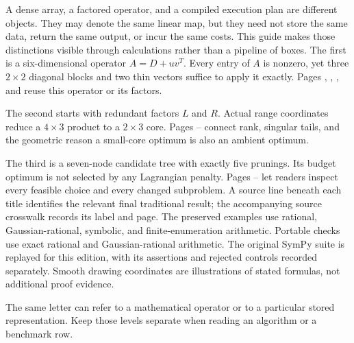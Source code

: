 A dense array, a factored operator, and a compiled execution plan are different objects. They may denote the same linear map, but they need not store the same data, return the same output, or incur the same costs. This guide makes those distinctions visible through calculations rather than a pipeline of boxes.
The first is a six-dimensional operator $A=D+uv^T$. Every entry of $A$ is nonzero, yet three $2\times2$ diagonal blocks and two thin vectors suffice to apply it exactly. Pages , , , and  reuse this operator or its factors.

The second starts with redundant factors $L$ and $R$. Actual range coordinates reduce a $4\times3$ product to a $2\times3$ core. Pages -- connect rank, singular tails, and the geometric reason a small-core optimum is also an ambient optimum.

The third is a seven-node candidate tree with exactly five prunings. Its budget optimum is not selected by any Lagrangian penalty. Pages -- let readers inspect every feasible choice and every changed subproblem.
A source line beneath each title identifies the relevant final traditional result; the accompanying source crosswalk records its label and page. The preserved examples use rational, Gaussian-rational, symbolic, and finite-enumeration arithmetic. Portable checks use exact rational and Gaussian-rational arithmetic. The original SymPy suite is replayed for this edition, with its assertions and rejected controls recorded separately. Smooth drawing coordinates are illustrations of stated formulas, not additional proof evidence.

The same letter can refer to a mathematical operator or to a particular stored representation. Keep those levels separate when reading an algorithm or a benchmark row.

